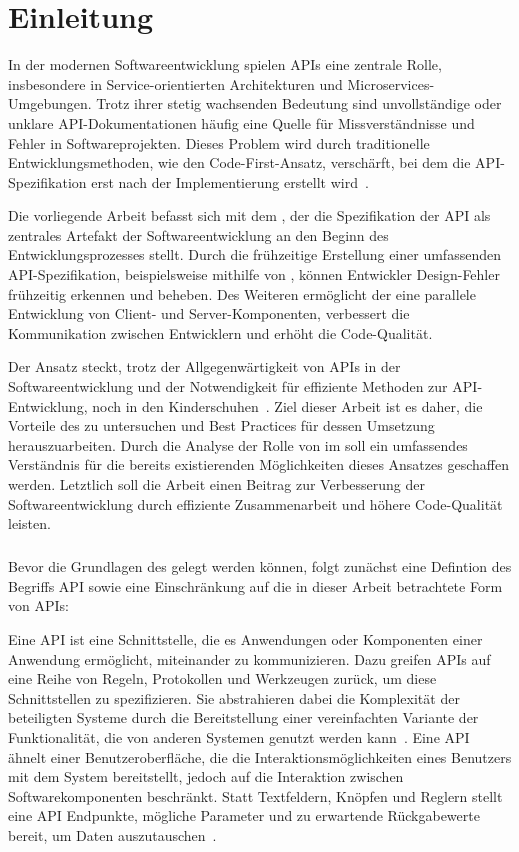 \chapter{Einleitung}
In der modernen Softwareentwicklung spielen \acp{API} eine zentrale Rolle, insbesondere in Service-orientierten Architekturen und Microservices-Umgebungen.
Trotz ihrer stetig wachsenden Bedeutung sind unvollständige oder unklare \ac{API}-Dokumentationen häufig eine Quelle für Missverständnisse und Fehler in Softwareprojekten.
Dieses Problem wird durch traditionelle Entwicklungsmethoden, wie den Code-First-Ansatz, verschärft, bei dem die \ac{API}-Spezifikation erst nach der Implementierung erstellt wird~\cite[73]{bea22}.

Die vorliegende Arbeit befasst sich mit dem \AFA, der die Spezifikation der \ac{API} als zentrales Artefakt der Softwareentwicklung an den Beginn des Entwicklungsprozesses stellt.
Durch die frühzeitige Erstellung einer umfassenden \ac{API}-Spezifikation, beispielsweise mithilfe von \OA, können Entwickler Design-Fehler frühzeitig erkennen und beheben.
Des Weiteren ermöglicht der \AFA eine parallele Entwicklung von Client- und Server-Komponenten, verbessert die Kommunikation zwischen Entwicklern und erhöht die Code-Qualität.

Der Ansatz steckt, trotz der Allgegenwärtigkeit von \acp{API} in der Softwareentwicklung und der Notwendigkeit für effiziente Methoden zur \ac{API}-Entwicklung, noch in den Kinderschuhen~\cite[78]{bea22}.
Ziel dieser Arbeit ist es daher, die Vorteile des \AFAes zu untersuchen und Best Practices für dessen Umsetzung herauszuarbeiten.
Durch die Analyse der Rolle von \OA im \AFA soll ein umfassendes Verständnis für die bereits existierenden Möglichkeiten dieses Ansatzes geschaffen werden.
Letztlich soll die Arbeit einen Beitrag zur Verbesserung der Softwareentwicklung durch effiziente Zusammenarbeit und höhere Code-Qualität leisten.

\paragraph{}
Bevor die Grundlagen des \AFAes gelegt werden können, folgt zunächst eine Defintion des Begriffs \acf{API} sowie eine Einschränkung auf die in dieser Arbeit betrachtete Form von \acp{API}:

Eine \ac{API} ist eine Schnittstelle, die es Anwendungen oder Komponenten einer Anwendung ermöglicht, miteinander zu kommunizieren.
Dazu greifen \acp{API} auf eine Reihe von Regeln, Protokollen und Werkzeugen zurück, um diese Schnittstellen zu spezifizieren.
Sie abstrahieren dabei die Komplexität der beteiligten Systeme durch die Bereitstellung einer vereinfachten Variante der Funktionalität, die von anderen Systemen genutzt werden kann~\cite[1]{kul23}.
Eine \ac{API} ähnelt einer Benutzeroberfläche, die die Interaktionsmöglichkeiten eines Benutzers mit dem System bereitstellt, jedoch auf die Interaktion zwischen Softwarekomponenten beschränkt.
Statt Textfeldern, Knöpfen und Reglern stellt eine \ac{API} Endpunkte, mögliche Parameter und zu erwartende Rückgabewerte bereit, um Daten auszutauschen~\cites[351]{de23}{ope23a}.

